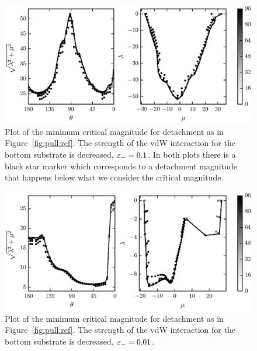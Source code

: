 	\begin{figure}
		\begin{center}
			\includegraphics{./fig/ch3/pull/eb0.1/grid.eps}
		\end{center}		
		\caption{Plot of the minimum critical magnitude for detachment as in Figure~\ref{fig:pull:ref}. The strength of the vdW interaction for the bottom substrate is decreased, $\varepsilon_-=0.1$. In both plots there is a black star marker which corresponds to a detachment magnitude that happens below what we consider the critical magnitude.
		\label{fig:pull:eb0.1}}
	\end{figure}

	\begin{figure}
		\begin{center}
			\includegraphics{./fig/ch3/pull/eb0.01/grid.eps}
		\end{center}		
		\caption{Plot of the minimum critical magnitude for detachment as in Figure~\ref{fig:pull:ref}. The strength of the vdW interaction for the bottom substrate is decreased, $\varepsilon_-=0.01$. 
		\label{fig:pull:eb0.01}}
	\end{figure}
	

